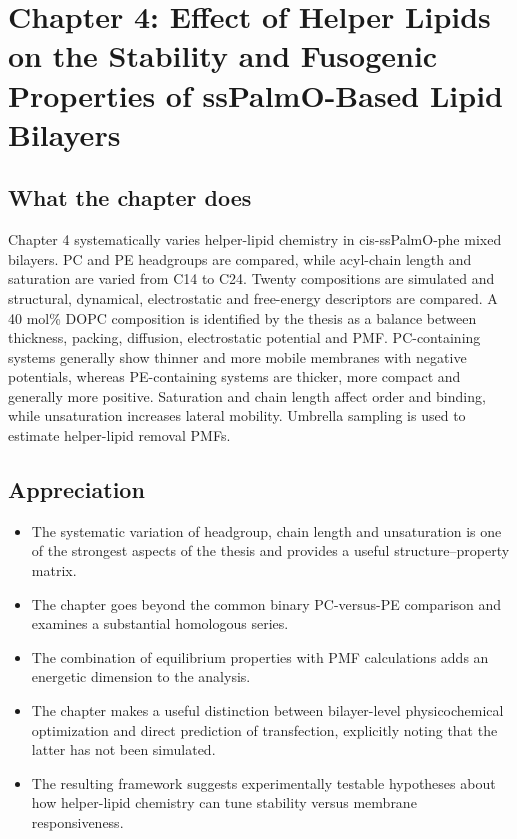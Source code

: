 \documentclass[11pt,a4paper]{article}
\begin{document}
\section{Chapter 4: Effect of Helper Lipids on the Stability and Fusogenic Properties of ssPalmO-Based Lipid Bilayers}

\subsection*{What the chapter does}

Chapter 4 systematically varies helper-lipid chemistry in cis-ssPalmO-phe mixed bilayers. PC and PE headgroups are compared, while acyl-chain length and saturation are varied from C14 to C24. Twenty compositions are simulated and structural, dynamical, electrostatic and free-energy descriptors are compared. A 40 mol\% DOPC composition is identified by the thesis as a balance between thickness, packing, diffusion, electrostatic potential and PMF. PC-containing systems generally show thinner and more mobile membranes with negative potentials, whereas PE-containing systems are thicker, more compact and generally more positive. Saturation and chain length affect order and binding, while unsaturation increases lateral mobility. Umbrella sampling is used to estimate helper-lipid removal PMFs.

\subsection*{Appreciation}

\begin{itemize}[leftmargin=*]
\item The systematic variation of headgroup, chain length and unsaturation is one of the strongest aspects of the thesis and provides a useful structure--property matrix.
\item The chapter goes beyond the common binary PC-versus-PE comparison and examines a substantial homologous series.
\item The combination of equilibrium properties with PMF calculations adds an energetic dimension to the analysis.
\item The chapter makes a useful distinction between bilayer-level physicochemical optimization and direct prediction of transfection, explicitly noting that the latter has not been simulated.
\item The resulting framework suggests experimentally testable hypotheses about how helper-lipid chemistry can tune stability versus membrane responsiveness.
\end{itemize}
\end{document}
